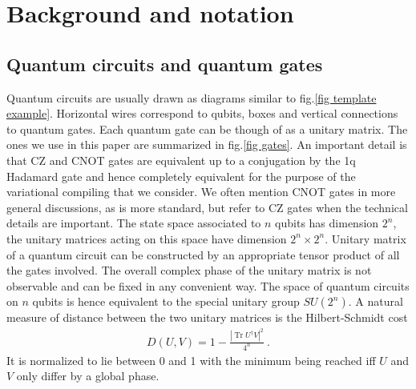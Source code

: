 \documentclass[twocolumn, amsfonts, amssymb, aps, nofootinbib]{revtex4-2}
\newcommand{\CZ}{CZ }
\newcommand{\CX}{CNOT }
\begin{document}
\section{Background and notation}
\subsection{Quantum circuits and quantum gates}
Quantum circuits are usually drawn as diagrams similar to fig.\ref{fig template example}. Horizontal wires correspond to qubits, boxes and vertical connections to quantum gates. Each quantum gate can be though of as a unitary matrix. The ones we use in this paper are summarized in fig.\ref{fig gates}. An important detail is that \CZ and \CX gates are equivalent up to a conjugation by the 1q Hadamard gate and hence completely equivalent for the purpose of the variational compiling that we consider. We often mention \CX gates in more general discussions, as is more standard, but refer to \CZ gates when the technical details are important.
The state space associated to $n$ qubits has dimension $2^n$, the unitary matrices acting on this space have dimension $2^n\times 2^n$. Unitary matrix of a quantum circuit can be constructed by an appropriate tensor product of all the gates involved. The overall complex phase of the unitary matrix is not observable and can be fixed in any convenient way. The space of quantum circuits on $n$ qubits is hence equivalent to the special unitary group $SU(2^n)$. A natural measure of distance between the two unitary matrices is the Hilbert-Schmidt cost
\begin{align}
D(U, V)=1-\frac{|\operatorname{Tr}U^\dagger V|^2}{4^n} \ . \label{D hst}
\end{align}
It is normalized to lie between 0 and 1 with the minimum being reached iff $U$ and $V$ only differ by a global phase.
\end{document}
